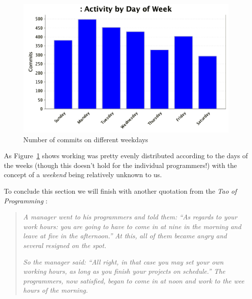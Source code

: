 \begin{figure}[phbt]
\centering\includegraphics[width=0.65\linewidth]{chapter_reference_fig/activity_day}
\caption{Number of commits on different weekdays}\label{IG:fig:day}
\end{figure}

As Figure~\ref{IG:fig:day} shows working was pretty evenly distributed according to the days of the weeks (though this doesn't hold for the individual programmers!) with the concept of a \emph{weekend} being relatively unknown to us.\smallskip

\noindent
To conclude this section we will finish with another quotation from the \emph{Tao of Programming} \cite{reference:tao}: \smallskip

\noindent
\begin{quote}
\emph{A manager went to his programmers and told them: ``As regards to your work hours: you are going to have to come in at nine in the morning and leave at five in the afternoon.'' At this, all of them became angry and several resigned on the spot.}\smallskip

\noindent
\emph{So the manager said: ``All right, in that case you may set your own working hours, as long as you finish your projects on schedule.'' The programmers, now satisfied, began to come in at noon and work to the wee hours of the morning.}
\end{quote}
 
